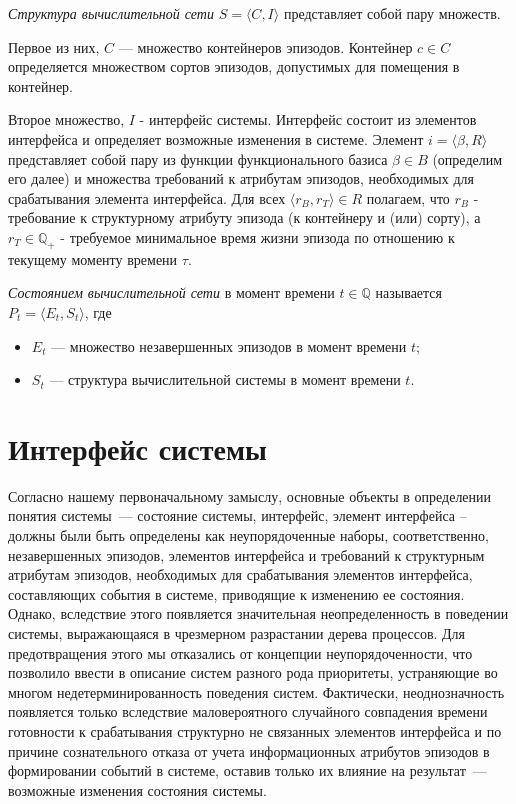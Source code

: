 \textit{Структура вычислительной сети} $ S = \langle C, I \rangle $ представляет собой пару множеств. 

Первое из них, $ C $ --- множество контейнеров эпизодов. 
Контейнер $ c \in C $ определяется множеством сортов эпизодов, допустимых для помещения в контейнер.

Второе множество, $ I $ - интерфейс системы. 
Интерфейс состоит из элементов интерфейса и определяет возможные изменения в системе. 
Элемент $ i  = \langle \beta, R \rangle $ представляет собой пару из функции функционального базиса $ \beta \in B $ (определим его далее) и множества требований к атрибутам эпизодов, необходимых для срабатывания элемента интерфейса.
Для всех $ \langle r_B, r_T \rangle \in R $ полагаем, что $ r_B $ - требование к структурному атрибуту эпизода (к контейнеру и (или) сорту), а $ r_T \in \mathbb{Q}_+ $ - требуемое минимальное время жизни эпизода по отношению к текущему моменту времени $ \tau $.

\textit{Состоянием вычислительной сети} в момент времени $ t \in \mathbb{Q} $ называется $ P_t = \langle E_t, S_t \rangle $, где
\begin{itemize}
	\item $ E_t $ --- множество незавершенных эпизодов в момент времени $ t $;
	\item $ S_t $ --- структура вычислительной системы в момент времени $ t $.
\end{itemize}


\section{Интерфейс системы}
Согласно нашему первоначальному замыслу, основные объекты в определении понятия системы~--- состояние системы, интерфейс, элемент интерфейса – должны были быть определены как неупорядоченные наборы, соответственно, незавершенных эпизодов, элементов интерфейса и требований к структурным атрибутам эпизодов, необходимых для срабатывания элементов интерфейса, составляющих события в системе, приводящие к изменению ее состояния. 
Однако, вследствие этого появляется значительная неопределенность в поведении системы, выражающаяся в чрезмерном разрастании дерева процессов. Для предотвращения этого мы отказались от концепции неупорядоченности, что позволило ввести в описание систем разного рода приоритеты, устраняющие во многом недетерминированность поведения систем. 
Фактически, неоднозначность появляется только вследствие маловероятного случайного совпадения времени готовности к срабатывания структурно не связанных элементов интерфейса и по причине сознательного отказа от учета информационных атрибутов эпизодов в формировании событий в системе, оставив только их влияние на результат~--- возможные изменения состояния системы.

